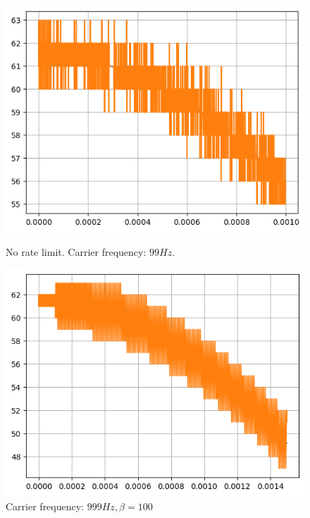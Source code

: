 \documentclass[a4paper]{article}
\begin{document}
\begin{figure}[!h]
	\centering
	\begin{minipage}{0.45\linewidth}
		\centering
		\includegraphics[scale = 0.58]{SIM_ratelimit/99Hz/No_RL_Ts_1000s.png}
		\caption{No rate limit. Carrier frequency: $99 Hz$.}
        \label{fig:direct_psd}
	\end{minipage}
	\hfil
	\begin{minipage}{0.45\linewidth}
		\centering
		\includegraphics[scale = 0.6]{SIM_ratelimit/99Hz/RL_1e6_Ts_ALLs.png}
		\caption{Carrier frequency: $999 Hz, \beta = 100$}
   \label{fig:dsm_psd}
	\end{minipage}
\end{figure}
\end{document}
